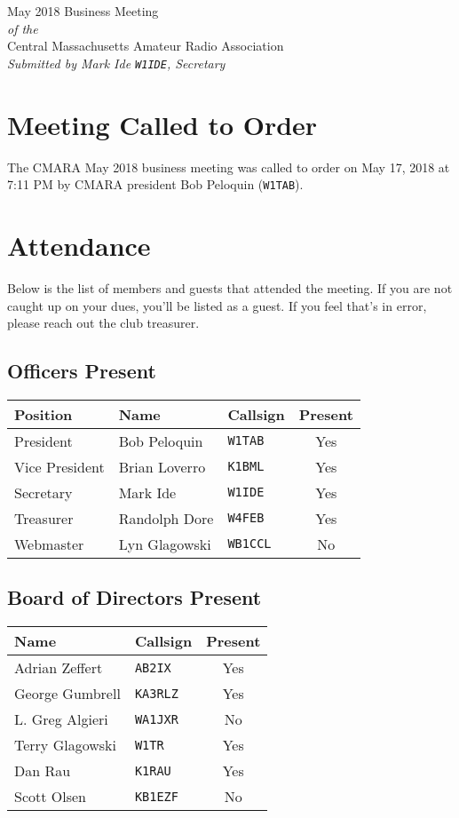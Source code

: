 \documentclass[10pt,letterpaper]{article}
\begin{document}
\begin{center}
{\huge May 2018 Business Meeting}\\
\emph{of the}\\
{\Large Central Massachusetts Amateur Radio Association}\\
\emph{Submitted by Mark Ide \texttt{W1IDE}, Secretary}
\end{center}

\section{Meeting Called to Order}
The CMARA May 2018 business meeting was called to order on May 17, 2018 at 7:11 PM by CMARA president Bob Peloquin (\texttt{W1TAB}).

\section{Attendance}
\noindent
Below is the list of members and guests that attended the meeting. If you are not caught up on your dues, you'll be listed as a guest. If you feel that's in error, please reach out the club treasurer.

\subsection{Officers Present}
\begin{tabular}{|l|l|l|c|}
  \hline
  \textbf{Position} & \textbf{Name}  & \textbf{Callsign} & \textbf{Present} \\ \hline
  President         & Bob Peloquin   & \texttt{W1TAB}    & Yes \\
  Vice President    & Brian Loverro  & \texttt{K1BML}    & Yes \\
  Secretary         & Mark Ide       & \texttt{W1IDE}    & Yes \\
  Treasurer         & Randolph Dore  & \texttt{W4FEB}    & Yes \\
  Webmaster         & Lyn Glagowski  & \texttt{WB1CCL}   & No  \\
  \hline
\end{tabular}

\subsection{Board of Directors Present}
\begin{tabular}{|l|l|c|}
  \hline
  \textbf{Name}     & \textbf{Callsign} & \textbf{Present} \\ \hline
  Adrian Zeffert  & \texttt{AB2IX}    & Yes \\
  George Gumbrell & \texttt{KA3RLZ}   & Yes \\
  L. Greg Algieri & \texttt{WA1JXR}   & No  \\
  Terry Glagowski & \texttt{W1TR}     & Yes \\
  Dan Rau         & \texttt{K1RAU}    & Yes \\
  Scott Olsen     & \texttt{KB1EZF}   & No  \\
  \hline
\end{tabular}
\end{document}
